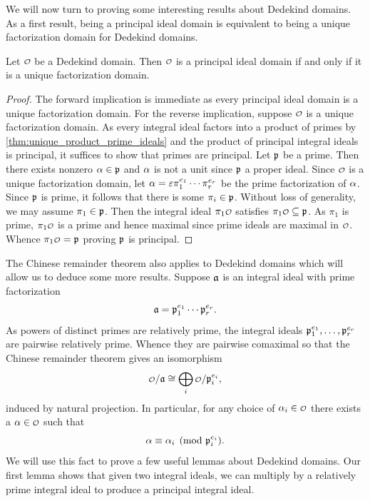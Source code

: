     We will now turn to proving some interesting results about Dedekind domains. As a first result, being a principal ideal domain is equivalent to being a unique factorization domain for Dedekind domains.

    \begin{proposition}\label{prop:UDF_PID_equivalence_for_Dedekind}
      Let \(\smc{O}\) be a Dedekind domain. Then \(\smc{O}\) is a principal ideal domain if and only if it is a unique factorization domain.
    \end{proposition}
    \begin{proof}
      The forward implication is immediate as every principal ideal domain is a unique factorization domain. For the reverse implication, suppose \(\smc{O}\) is a unique factorization domain. As every integral ideal factors into a product of primes by \cref{thm:unique_product_prime_ideals} and the product of principal integral ideals is principal, it suffices to show that primes are principal. Let \(\mathfrak{p}\) be a prime. Then there exists nonzero \(\alpha \in \mathfrak{p}\) and \(\alpha\) is not a unit since \(\mathfrak{p}\) a proper ideal. Since \(\smc{O}\) is a unique factorization domain, let \(\alpha = \varepsilon\pi_{1}^{e_{1}} \cdots \pi_{r}^{e_{r}}\) be the prime factorization of \(\alpha\). Since \(\mathfrak{p}\) is prime, it follows that there is some \(\pi_{i} \in \mathfrak{p}\). Without loss of generality, we may assume \(\pi_{1} \in \mathfrak{p}\). Then the integral ideal \(\pi_{1}\smc{O}\) satisfies \(\pi_{1}\smc{O} \subseteq \mf{p}\). As \(\pi_{1}\) is prime, \(\pi_{1}\smc{O}\) is a prime and hence maximal since prime ideals are maximal in \(\smc{O}\). Whence \(\pi_{1}\smc{O} = \mf{p}\) proving \(\mathfrak{p}\) is principal.
    \end{proof}

    The Chinese remainder theorem also applies to Dedekind domains which will allow us to deduce some more results. Suppose \(\mathfrak{a}\) is an integral ideal with prime factorization
    \[
      \mathfrak{a} = \mathfrak{p}_{1}^{e_{1}} \cdots \mathfrak{p}_{r}^{e_{r}}.
    \]
    As powers of distinct primes are relatively prime, the integral ideals \(\mathfrak{p}_{1}^{e_{1}},\ldots,\mathfrak{p}_{r}^{e_{r}}\) are pairwise relatively prime. Whence they are pairwise comaximal so that the Chinese remainder theorem gives an isomorphism
    \[
      \smc{O}/\mf{a} \cong \bigop_{i}\smc{O}/\mf{p}_{i}^{e_{i}},
    \]
    induced by natural projection. In particular, for any choice of \(\a_{i} \in \smc{O}\) there exists a \(\a \in \smc{O}\) such that
    \[
      \alpha \equiv \alpha_{i} \pmod{\mathfrak{p}_{i}^{e_{i}}}.
    \]
    We will use this fact to prove a few useful lemmas about Dedekind domains. Our first lemma shows that given two integral ideals, we can multiply by a relatively prime integral ideal to produce a principal integral ideal.

